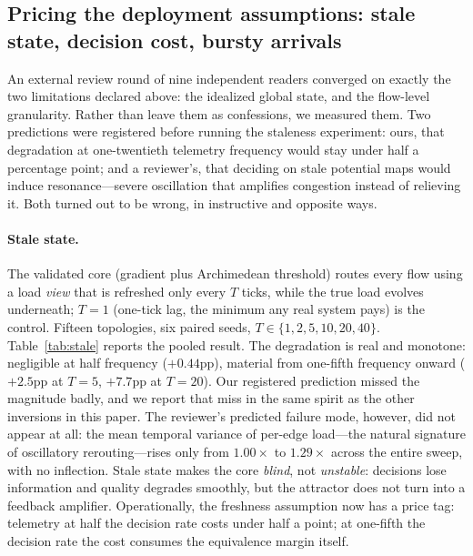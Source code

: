 ﻿%
\subsection{Pricing the deployment assumptions: stale state, decision cost, bursty arrivals}
\label{sec:freshness}

An external review round of nine independent readers converged on exactly the
two limitations declared above: the idealized global state, and the flow-level
granularity. Rather than leave them as confessions, we measured them. Two
predictions were registered before running the staleness experiment: ours, that
degradation at one-twentieth telemetry frequency would stay under half a
percentage point; and a reviewer's, that deciding on stale potential maps would
induce resonance---severe oscillation that amplifies congestion instead of
relieving it. Both turned out to be wrong, in instructive and opposite ways.

\paragraph{Stale state.}
The validated core (gradient plus Archimedean threshold) routes every flow
using a load \emph{view} that is refreshed only every $T$ ticks, while the true
load evolves underneath; $T{=}1$ (one-tick lag, the minimum any real system
pays) is the control. Fifteen topologies, six paired seeds, $T \in
\{1,2,5,10,20,40\}$. Table~\ref{tab:stale} reports the pooled result. The
degradation is real and monotone: negligible at half frequency
($+0.44$pp), material from one-fifth frequency onward ($+2.5$pp at $T{=}5$,
$+7.7$pp at $T{=}20$). Our registered prediction missed the magnitude badly,
and we report that miss in the same spirit as the other inversions in this
paper. The reviewer's predicted failure mode, however, did not appear at all:
the mean temporal variance of per-edge load---the natural signature of
oscillatory rerouting---rises only from $1.00\times$ to $1.29\times$ across
the entire sweep, with no inflection. Stale state makes the core
\emph{blind}, not \emph{unstable}: decisions lose information and quality
degrades smoothly, but the attractor does not turn into a feedback amplifier.
Operationally, the freshness assumption now has a price tag: telemetry at
half the decision rate costs under half a point; at one-fifth the decision
rate the cost consumes the equivalence margin itself.

